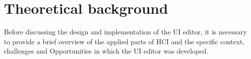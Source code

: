 %
\chapter{Theoretical background}
\label{chap:background}

Before discussing the design and implementation of the UI editor, it is necessary to provide a brief overview of the applied parts of HCI and the specific context, challenges and Opportunities in which the UI editor was developed.
% 

